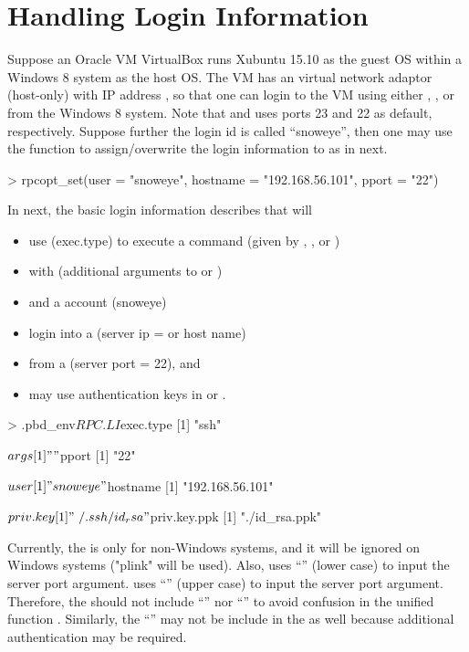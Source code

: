 \section[Handling Login Information]{Handling Login Information}
\label{sec:handling_login_information}

Suppose an Oracle VM VirtualBox runs Xubuntu 15.10 as the guest OS within a
Windows 8 system as the host OS.
The VM has an virtual network adaptor (host-only)
with IP address , so that one can
login to the VM using either , , or 
from the Windows 8 system.
Note that  and  uses ports 23 and 22 as default,
respectively.
Suppose further the login id is called ``snoweye'', then one may use
the function  to assign/overwrite the login information to
 as in next.
\begin{Code}[title=Set login information]
> rpcopt_set(user = "snoweye", hostname = "192.168.56.101", pport = "22")
\end{Code}

In next, the basic login information  describes that
 will
\begin{itemize}
\item use  (exec.type) to execute a command
      (given by , , or )
\item with  (additional arguments to  or )
\item and a  account (snoweye)
\item login into a  (server ip =  or
      host name)
\item from a  (server port = 22), and
\item may use authentication keys in  or .
\end{itemize}
\begin{Code}[title=Basic \code{RPC.LI}]
> .pbd_env$RPC.LI
$exec.type
[1] "ssh"

$args
[1] ""

$pport
[1] "22"

$user
[1] "snoweye"

$hostname
[1] "192.168.56.101"

$priv.key
[1] "~/.ssh/id_rsa"

$priv.key.ppk
[1] "./id_rsa.ppk"
\end{Code}
Currently, the  is only for non-Windows systems, and it
will be ignored on Windows systems ("plink" will be used).
Also,  uses ``'' (lower case) to input the server port
argument.
 uses ``'' (upper case) to input the server port
argument.
Therefore, the  should not include ``'' nor ``''
to avoid confusion in the unified function .
Similarly, the ``'' may not be include in the  as well
because additional authentication may be required.

